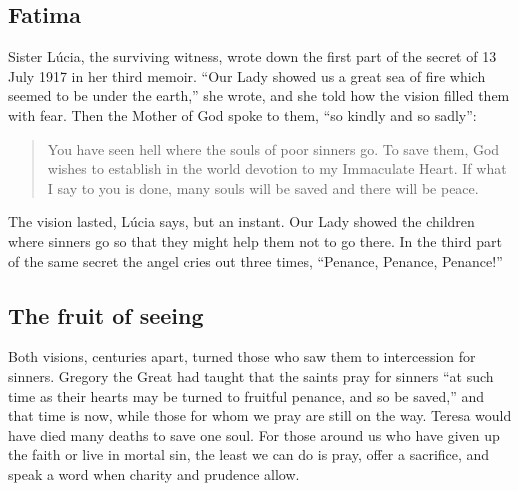 \subsection{Fatima}

Sister Lúcia, the surviving witness, wrote down the first part of the secret of 13 July 1917 in her third memoir. ``Our Lady showed us a great sea of fire which seemed to be under the earth,'' she wrote, and she told how the vision filled them with fear. Then the Mother of God spoke to them, ``so kindly and so sadly'':

\begin{quote}
You have seen hell where the souls of poor sinners go. To save them, God wishes to establish in the world devotion to my Immaculate Heart. If what I say to you is done, many souls will be saved and there will be peace.
\end{quote}

\noindent The vision lasted, Lúcia says, but an instant. Our Lady showed the children where sinners go so that they might help them not to go there. In the third part of the same secret the angel cries out three times, ``Penance, Penance, Penance!''

\subsection{The fruit of seeing}

Both visions, centuries apart, turned those who saw them to intercession for sinners. Gregory the Great had taught that the saints pray for sinners ``at such time as their hearts may be turned to fruitful penance, and so be saved,'' and that time is now, while those for whom we pray are still on the way. Teresa would have died many deaths to save one soul. For those around us who have given up the faith or live in mortal sin, the least we can do is pray, offer a sacrifice, and speak a word when charity and prudence allow.
